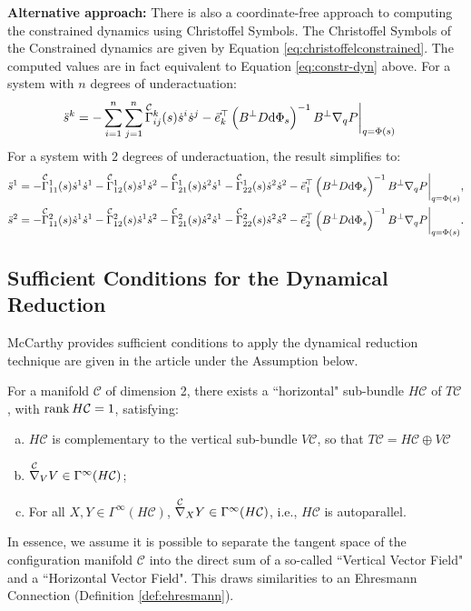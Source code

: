 \documentclass[main.tex]{subfiles}
\begin{document}
\textbf{Alternative approach:} There is also a coordinate-free approach to computing the constrained dynamics using Christoffel Symbols. The Christoffel Symbols of the Constrained dynamics are given by Equation \ref{eq:christoffelconstrained}. 
The computed values are in fact equivalent to Equation \ref{eq:constr-dyn} above\cite{nielsen-note}. 
For a system with $n$ degrees of underactuation:
\begin{align}
\ddot s^k &= -\sum_{i=1}^{n}\sum_{j=1}^{n}\Gammac{k}{ij}(s)\dot{s}^i\dot{s}^j-\Vec{e}_k^\top\del{B^\bot D \dd\Phi_s}\inv B^\bot\nabla_q P \bigg|_{q=\Phi(s)}
\end{align}
For a system with $2$ degrees of underactuation, the result simplifies to:
\begin{align}
\begin{aligned}
\ddot s^1 &= 
-\Gammac{1}{11}(s)\dot{s}^1\dot{s}^1
-\Gammac{1}{12}(s)\dot{s}^1\dot{s}^2
-\Gammac{1}{21}(s)\dot{s}^2\dot{s}^1
-\Gammac{1}{22}(s)\dot{s}^2\dot{s}^2
-\Vec{e}_1^\top\del{B^\bot D \dd\Phi_s}\inv B^\bot\nabla_q P \bigg|_{q=\Phi(s)},\\
\ddot s^2 &= 
-\Gammac{2}{11}(s)\dot{s}^1\dot{s}^1
-\Gammac{2}{12}(s)\dot{s}^1\dot{s}^2
-\Gammac{2}{21}(s)\dot{s}^2\dot{s}^1
-\Gammac{2}{22}(s)\dot{s}^2\dot{s}^2
-\Vec{e}_2^\top\del{B^\bot D \dd\Phi_s}\inv B^\bot\nabla_q P \bigg|_{q=\Phi(s)}.
\end{aligned}\label{eq:constr-dyn-gammac}
\end{align}

\subsection{Sufficient Conditions for the Dynamical Reduction}
McCarthy provides sufficient conditions to apply the dynamical reduction technique are given in the article under the Assumption below.
\begin{boxassumption}{\cite{mccarthy}}
For a manifold $\mathcal{C}$ of dimension 2, there exists a ``horizontal" sub-bundle $H\mathcal{C}$ of $T\mathcal{C}$, with $\rank H\mathcal{C}=1$, satisfying:
\begin{enumerate}[(a)]
    \item $H\mathcal{C}$ is complementary to the vertical sub-bundle $V\mathcal{C}$, so that $T\mathcal{C}=H\mathcal{C}\oplus V\mathcal{C}$
\item $\nablac_V V \in\Gamma^\infty(H\mathcal{C})$;
\item For all $X,Y\in \Gamma^\infty(H\mathcal{C})$, $\nablac_X Y \in \Gamma^\infty(H\mathcal{C})$, i.e., $H\mathcal{C}$ is autoparallel.
\end{enumerate}
\end{boxassumption}\label{assumption1}
In essence, we assume it is possible to separate the tangent space of the configuration manifold $\mathcal{C}$ into the direct sum of a so-called ``Vertical Vector Field" and a ``Horizontal Vector Field". This draws similarities to an Ehresmann Connection (Definition \ref{def:ehresmann}).
\end{document}

